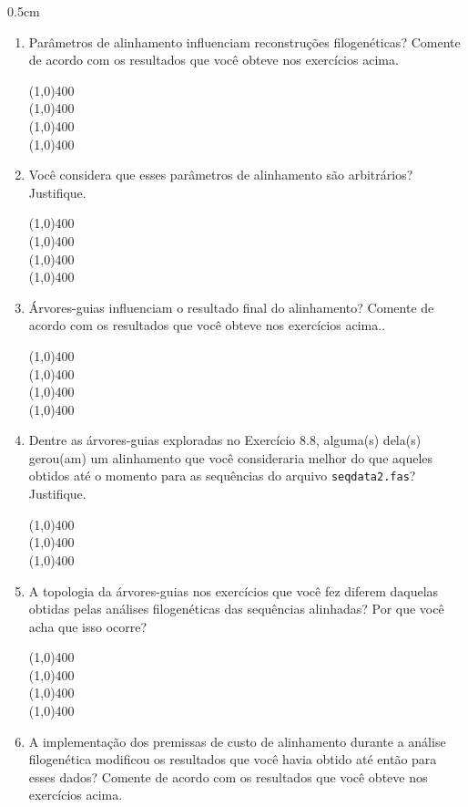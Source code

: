 \begin{refsection}
\begin {myindentpar}{0.5cm}
\begin{enumerate}[\itshape 1.]
	\item{Parâmetros de alinhamento influenciam reconstruções filogenéticas? Comente de acordo com os resultados que você obteve nos exercícios acima.}

\line(1,0){400}\\
\line(1,0){400}\\
\line(1,0){400}\\
\line(1,0){400}\\

	\item{Você considera que esses parâmetros de alinhamento são arbitrários? Justifique.}

\line(1,0){400}\\
\line(1,0){400}\\
\line(1,0){400}\\
\line(1,0){400}\\


	\item{Árvores-guias influenciam o resultado final do alinhamento? Comente de acordo com os resultados que você obteve nos exercícios acima..}

\line(1,0){400}\\
\line(1,0){400}\\
\line(1,0){400}\\
\line(1,0){400}\\

	\item{Dentre as árvores-guias exploradas no Exercício 8.8, alguma(s) dela(s) gerou(am) um alinhamento que você consideraria melhor do que aqueles obtidos até o momento para as sequências do arquivo \texttt{seqdata2.fas}? Justifique.}

\line(1,0){400}\\
\line(1,0){400}\\
\line(1,0){400}\\

	\item{A topologia da árvores-guias nos exercícios que você fez diferem daquelas obtidas pelas análises filogenéticas das sequências alinhadas? Por que você acha que isso ocorre?}

\line(1,0){400}\\
\line(1,0){400}\\
\line(1,0){400}\\
\line(1,0){400}\\


	\item{A implementação dos premissas de custo de alinhamento durante a análise filogenética modificou os resultados que você havia obtido até então para esses dados? Comente de acordo com os resultados que você obteve nos exercícios acima.}


\end{enumerate}
\end{myindentpar}
\end{refsection}
